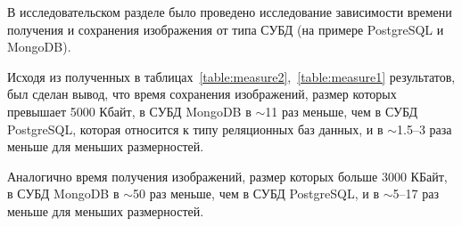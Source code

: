 В исследовательском разделе было проведено исследование зависимости времени получения и сохранения изображения от типа СУБД (на примере PostgreSQL и MongoDB).

Исходя из полученных в таблицах~\ref{table:measure2},~\ref{table:measure1} результатов, был сделан вывод, что время сохранения изображений, размер которых превышает 5000 Кбайт, в СУБД MongoDB в $\sim$11 раз меньше, чем в СУБД PostgreSQL, которая относится к типу реляционных баз данных, и в $\sim$1.5--3 раза меньше для меньших размерностей.

Аналогично время получения изображений, размер которых больше 3000 КБайт, в СУБД MongoDB в $\sim$50 раз меньше, чем в СУБД PostgreSQL, и в $\sim$5--17 раз меньше для меньших размерностей.


